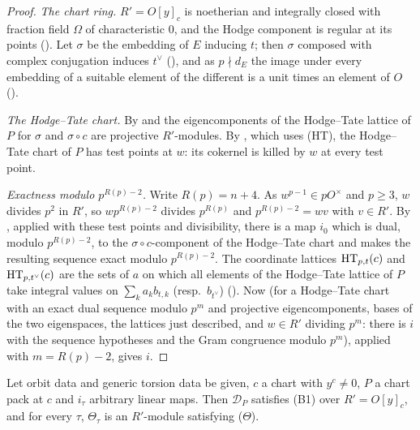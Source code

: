 \begin{proof}
\emph{The chart ring.} $R'=O[y]_c$ is noetherian and integrally closed with fraction field $\Omega$ of characteristic $0$, and the
Hodge component is regular at its points (). Let $\sigma$ be the
embedding of $E$ inducing $t$; then $\sigma$ composed with complex conjugation induces $t^\vee$
(), and as $p\nmid d_E$ the image under every embedding of a suitable
element of the different is a unit times an element of $O$ ().

\emph{The Hodge--Tate chart.} By  and
 the eigencomponents of the Hodge--Tate lattice of $P$ for $\sigma$ and
$\sigma\circ c$ are projective $R'$-modules. By , which uses (HT), the
Hodge--Tate chart of $P$ has test points at $w$: its cokernel is killed by $w$ at every test point.

\emph{Exactness modulo $p^{R(p)-2}$.} Write $R(p)=n+4$. As $w^{p-1}\in pO^\times$ and $p\ge3$, $w$ divides $p^2$ in $R'$, so
$wp^{R(p)-2}$ divides $p^{R(p)}$ and $p^{R(p)-2}=wv$ with $v\in R'$. By , applied
with these test points and divisibility, there is a map $i_0$ which is dual, modulo $p^{R(p)-2}$, to the $\sigma\circ c$-component
of the Hodge--Tate chart and makes the resulting sequence exact modulo $p^{R(p)-2}$. The coordinate lattices
$\mathrm{HT}_{p,t}(c)$ and $\mathrm{HT}_{p,t^\vee}(c)$ are the sets of $a$ on which all elements of the Hodge--Tate lattice of $P$ take
integral values on $\sum_ka_kb_{t,k}$ (resp.\ $b_{t^\vee}$) (). Now
 (for a Hodge--Tate chart with an exact dual sequence
modulo $p^m$ and projective eigencomponents, bases of the two eigenspaces, the lattices just described, and $w\in R'$ dividing
$p^m$: there is $i$ with the sequence hypotheses and the Gram congruence modulo $p^m$), applied with $m=R(p)-2$, gives $i$.
\end{proof}

\begin{lemma}\label{pf:tower:hpcount}
Let orbit data and generic torsion data be given, $c$ a chart with $y^c\ne0$, $P$ a chart pack at $c$ and $i_\tau$ arbitrary
linear maps. Then $\mathcal D_P$ satisfies \textup{(B1)} over $R'=O[y]_c$, and for every $\tau$, $\Theta_\tau$ is an $R'$-module
satisfying \textup{($\Theta$)}.
\end{lemma}

